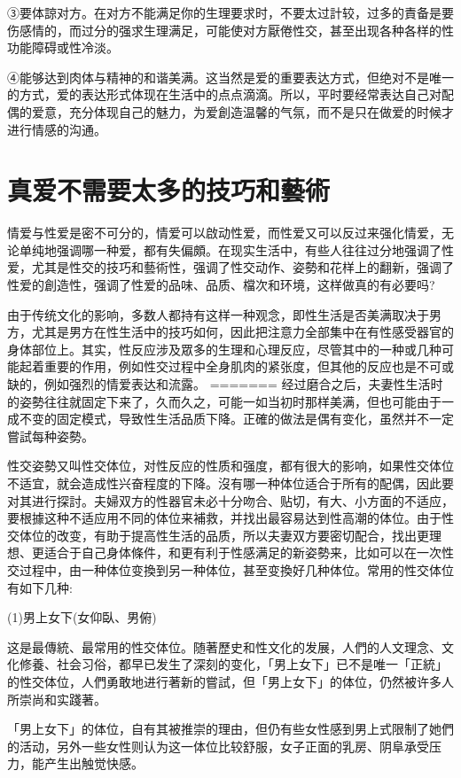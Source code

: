 \documentclass[12pt,UTF8]{ctexbook}
\begin{document}
③要体諒对方。在对方不能满足你的生理要求时，不要太过計较，过多的責备是要伤感情的，而过分的强求生理满足，可能使对方厭倦性交，甚至出现各种各样的性功能障碍或性冷淡。

④能够达到肉体与精神的和谐美满。这当然是爱的重要表达方式，但绝对不是唯一的方式，爱的表达形式体现在生活中的点点滴滴。所以，平时要经常表达自己对配偶的爱意，充分体现自己的魅力，为爱創造温馨的气氛，而不是只在做爱的时候才进行情感的沟通。

\section{真爱不需要太多的技巧和藝術}

情爱与性爱是密不可分的，情爱可以啟动性爱，而性爱又可以反过来强化情爱，无论单纯地强调哪一种爱，都有失偏頗。在现实生活中，有些人往往过分地强调了性爱，尤其是性交的技巧和藝術性，强调了性交动作、姿勢和花样上的翻新，强调了性爱的創造性，强调了性爱的品味、品质、檔次和环境，这样做真的有必要吗?

由于传统文化的影响，多数人都持有这样一种观念，即性生活是否美满取决于男方，尤其是男方在性生活中的技巧如何，因此把注意力全部集中在有性感受器官的身体部位上。其实，性反应涉及眾多的生理和心理反应，尽管其中的一种或几种可能起着重要的作用，例如性交过程中全身肌肉的紧张度，但其他的反应也是不可或缺的，例如强烈的情爱表达和流露。
=======
经过磨合之后，夫妻性生活时的姿勢往往就固定下来了，久而久之，可能一如当初时那样美满，但也可能由于一成不变的固定模式，导致性生活品质下降。正確的做法是偶有变化，虽然并不一定嘗試每种姿勢。

性交姿勢又叫性交体位，对性反应的性质和强度，都有很大的影响，如果性交体位不适宜，就会造成性兴奋程度的下降。沒有哪一种体位适合于所有的配偶，因此要对其进行探討。夫婦双方的性器官未必十分吻合、贴切，有大、小方面的不适应，要根據这种不适应用不同的体位来補救，并找出最容易达到性高潮的体位。由于性交体位的改变，有助于提高性生活的品质，所以夫妻双方要密切配合，找出更理想、更适合于自己身体條件，和更有利于性感满足的新姿勢来，比如可以在一次性交过程中，由一种体位变換到另一种体位，甚至变換好几种体位。常用的性交体位有如下几种:

(1)男上女下(女仰臥、男俯)

这是最傳統、最常用的性交体位。随著歷史和性文化的发展，人們的人文理念、文化修養、社会习俗，都早已发生了深刻的变化，「男上女下」已不是唯一「正統」的性交体位，人們勇敢地进行著新的嘗試，但「男上女下」的体位，仍然被许多人所崇尚和实踐著。

「男上女下」的体位，自有其被推崇的理由，但仍有些女性感到男上式限制了她們的活动，另外一些女性则认为这一体位比较舒服，女子正面的乳房、阴阜承受压力，能产生出触觉快感。
\end{document}
